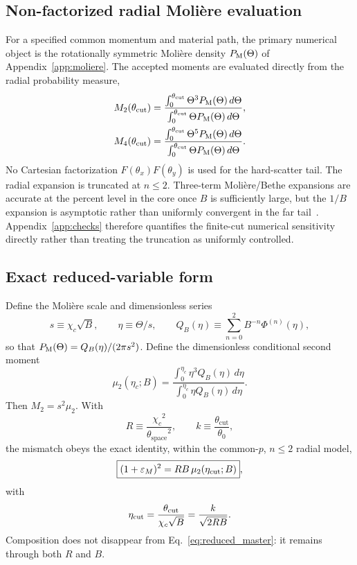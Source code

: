 \documentclass[aps,pra,reprint,longbibliography,floatfix]{revtex4-2}
\newcommand{\epsM}{\ensuremath{\varepsilon_M}}
\newcommand{\thetazero}{\ensuremath{\theta_0}}
\newcommand{\thetaspace}{\ensuremath{\theta_{\mathrm{space}}}}
\newcommand{\thetacut}{\ensuremath{\theta_{\mathrm{cut}}}}
\newcommand{\chic}{\ensuremath{\chi_c}}
\begin{document}
\subsection{Non-factorized radial Moli\`ere evaluation}\label{sec:quadrature}
For a specified common momentum and material path, the primary numerical object is the rotationally symmetric Moli\`ere density $P_{\rm M}(\Theta)$ of Appendix~\ref{app:moliere}.  The accepted moments are evaluated directly from the radial probability measure,
\begin{align}
M_2(\thetacut)&=\frac{\int_0^{\thetacut}\Theta^3P_{\rm M}(\Theta)\,d\Theta}{\int_0^{\thetacut}\Theta P_{\rm M}(\Theta)\,d\Theta},\label{eq:quad}\\
M_4(\thetacut)&=\frac{\int_0^{\thetacut}\Theta^5P_{\rm M}(\Theta)\,d\Theta}{\int_0^{\thetacut}\Theta P_{\rm M}(\Theta)\,d\Theta}.\label{eq:M4_radial}
\end{align}
No Cartesian factorization $F(\theta_x)F(\theta_y)$ is used for the hard-scatter tail.  The radial expansion is truncated at $n\le2$.  Three-term Moli\`ere/Bethe expansions are accurate at the percent level in the core once $B$ is sufficiently large, but the $1/B$ expansion is asymptotic rather than uniformly convergent in the far tail~\cite{andreo1993,bondarenco2016}.  Appendix~\ref{app:checks} therefore quantifies the finite-cut numerical sensitivity directly rather than treating the truncation as uniformly controlled.

\subsection{Exact reduced-variable form}\label{sec:reduced}
Define the Moli\`ere scale and dimensionless series
\begin{equation}
s\equiv\chic\sqrt{B},\qquad \eta\equiv\Theta/s,
\qquad
Q_B(\eta)\equiv\sum_{n=0}^{2}B^{-n}\Phi^{(n)}(\eta),
\end{equation}
so that $P_{\rm M}(\Theta)=Q_B(\eta)/(2\pi s^2)$.  Define the dimensionless conditional second moment
\begin{equation}\label{eq:mu2}
\mu_2(\eta_c;B)=
\frac{\int_0^{\eta_c}\eta^3Q_B(\eta)\,d\eta}
{\int_0^{\eta_c}\eta Q_B(\eta)\,d\eta}.
\end{equation}
Then $M_2=s^2\mu_2$.  With
\begin{equation}\label{eq:Rdef}
R\equiv\frac{\chic^2}{\thetaspace^2},\qquad
k\equiv\frac{\thetacut}{\thetazero},
\end{equation}
the mismatch obeys the exact identity, within the common-$p$, $n\le2$ radial model,
\begin{equation}\label{eq:reduced_master}
\boxed{(1+\epsM)^2=RB\,\mu_2(\eta_{\rm cut};B)},
\end{equation}
with
\begin{equation}\label{eq:eta_cut}
\eta_{\rm cut}=\frac{\thetacut}{\chic\sqrt{B}}
=\frac{k}{\sqrt{2RB}}.
\end{equation}
Composition does not disappear from Eq.~\eqref{eq:reduced_master}: it remains through both $R$ and $B$.
\end{document}
